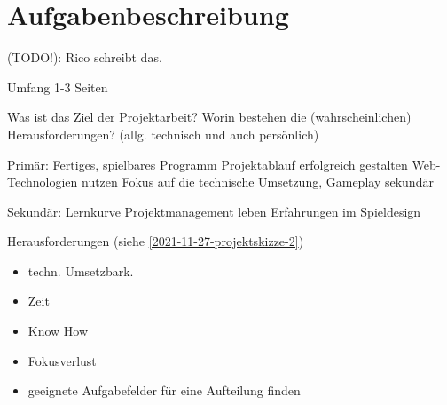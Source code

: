 

\section{Aufgabenbeschreibung}

(TODO!): Rico schreibt das.

Umfang 1-3 Seiten


Was ist das Ziel der Projektarbeit? Worin bestehen die (wahrscheinlichen) Herausforderungen? (allg. technisch und auch persönlich)

Primär: 
Fertiges, spielbares Programm 
Projektablauf erfolgreich gestalten 
Web-Technologien nutzen
Fokus auf die technische Umsetzung, Gameplay sekundär

Sekundär: 
Lernkurve
Projektmanagement leben
Erfahrungen im Spieldesign 

Herausforderungen (siehe \ref{2021-11-27-projektskizze-2})

\begin{itemize}
    \item techn. Umsetzbark.
    \item Zeit
    \item Know How
    \item Fokusverlust
    \item geeignete Aufgabefelder für eine Aufteilung finden 
\end{itemize}


